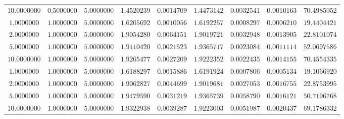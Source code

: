 \begin{tabular}{ccccccccc}
$10.0000000$ & $0.5000000$ & $5.0000000$ & $1.4520239$ & $0.0014709$ & $1.4473142$ & $0.0032541$ & $0.0010163$ & $70.4985052$\\
$1.0000000$ & $1.0000000$ & $5.0000000$ & $1.6205692$ & $0.0010056$ & $1.6192257$ & $0.0008297$ & $0.0006210$ & $19.4404421$\\
$2.0000000$ & $1.0000000$ & $5.0000000$ & $1.9054280$ & $0.0064151$ & $1.9019721$ & $0.0032948$ & $0.0013905$ & $22.8101074$\\
$5.0000000$ & $1.0000000$ & $5.0000000$ & $1.9410420$ & $0.0021523$ & $1.9365717$ & $0.0023084$ & $0.0011114$ & $52.0697586$\\
$10.0000000$ & $1.0000000$ & $5.0000000$ & $1.9265477$ & $0.0027209$ & $1.9222352$ & $0.0022435$ & $0.0014155$ & $70.4554335$\\
$1.0000000$ & $1.0000000$ & $5.0000000$ & $1.6188297$ & $0.0015886$ & $1.6191924$ & $0.0007806$ & $0.0005134$ & $19.1066920$\\
$2.0000000$ & $1.0000000$ & $5.0000000$ & $1.9062827$ & $0.0044699$ & $1.9019681$ & $0.0027053$ & $0.0016755$ & $22.8753995$\\
$5.0000000$ & $1.0000000$ & $5.0000000$ & $1.9479590$ & $0.0031219$ & $1.9365739$ & $0.0058790$ & $0.0016121$ & $50.7196768$\\
$10.0000000$ & $1.0000000$ & $5.0000000$ & $1.9322938$ & $0.0039287$ & $1.9223003$ & $0.0051987$ & $0.0020437$ & $69.1786332$\\
\end{tabular}
